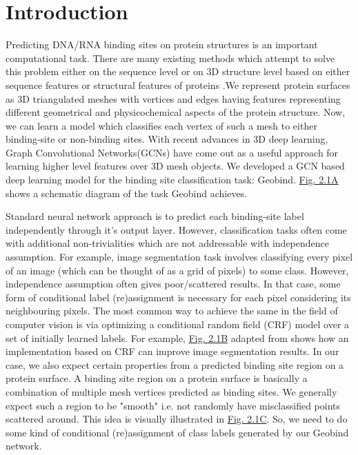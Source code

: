 \section{Introduction} Predicting DNA/RNA binding sites on protein structures is an important
computational task.  There are many existing methods which attempt to solve this problem either on
the sequence level or on 3D structure level based on either sequence features or structural features
of proteins \citep{deng2018pdrlgb, wang2010bindn+, wang2006bindn, li2013predna}
.We  represent protein surfaces as 3D triangulated meshes with 
vertices and edges having features representing different geometrical and physicochemical aspects
of the protein structure. Now, we can learn a model which classifies each vertex of such a mesh to either binding-site or
non-binding sites. With recent advances in 3D deep learning, Graph Convolutional
Networks(GCNs) have come out as a useful approach for learning higher level features over
3D mesh objects. We developed a GCN based deep learning model for the binding site classification
task: Geobind. \hyperref[fig:crf_concept]{Fig. 2.1A} shows a schematic diagram of
the task Geobind achieves.

Standard neural network approach is to predict each binding-site label independently
through it's output layer. However, classification tasks often come with additional non-trivialities which
are not addressable with independence assumption.  For example, image segmentation task involves
classifying every pixel of an image (which can be thought of as a grid of pixels) to some class.
However, independence assumption often gives poor/scattered results. In that case, some form of
conditional label (re)assignment is necessary for each pixel considering its neighbouring pixels. The
most common way to achieve the same in the field of computer vision is via optimizing a conditional
random  field (CRF) model over a set of initially  learned labels. For example,
\hyperref[fig:crf_concept]{Fig. 2.1B} adapted
from \citet{krahenbuhl2012efficient}  shows how an implementation based on CRF can improve image
segmentation results. In our case, we also expect certain properties from a predicted binding site
region on a protein surface. A binding site region on a protein surface is basically a combination
of multiple mesh vertices predicted as binding sites. We generally expect such a region to be
"smooth" i.e. not randomly have misclassified points scattered around. This idea is visually illustrated in
\hyperref[fig:crf_concept]{Fig. 2.1C}. So, we need to do some kind
of conditional (re)assignment of class labels generated by our Geobind network.

